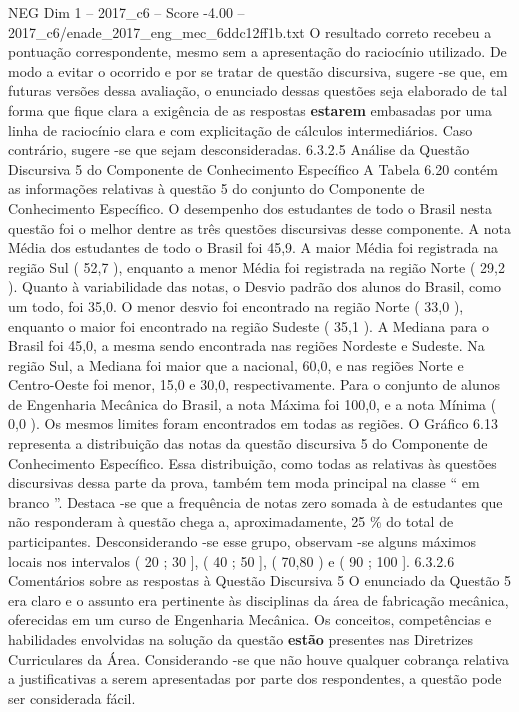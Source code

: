 \begin{textsample}{NEG Dim 1 – 2017\_c6 – Score -4.00 – 2017\_c6/enade\_2017\_eng\_mec\_6ddc12ff1b.txt}
O resultado correto recebeu a pontuação correspondente, mesmo sem a apresentação do raciocínio utilizado.
De modo a evitar o ocorrido e por se tratar de questão discursiva, sugere -se que, em futuras versões dessa avaliação, o enunciado dessas questões seja elaborado de tal forma que fique clara a exigência de as respostas \textbf{estarem} embasadas por uma linha de raciocínio clara e com explicitação de cálculos intermediários.
Caso contrário, sugere -se que sejam desconsideradas. 6.3.2.5 Análise da Questão Discursiva 5 do Componente de Conhecimento Específico A Tabela 6.20 contém as informações relativas à questão 5 do conjunto do Componente de Conhecimento Específico.
O desempenho dos estudantes de todo o Brasil nesta questão foi o melhor dentre as três questões discursivas desse componente.
A nota Média dos estudantes de todo o Brasil foi 45,9.
A maior Média foi registrada na região Sul ( 52,7 ), enquanto a menor Média foi registrada na região Norte ( 29,2 ).
Quanto à variabilidade das notas, o Desvio padrão dos alunos do Brasil, como um todo, foi 35,0.
O menor desvio foi encontrado na região Norte ( 33,0 ), enquanto o maior foi encontrado na região Sudeste ( 35,1 ).
A Mediana para o Brasil foi 45,0, a mesma sendo encontrada nas regiões Nordeste e Sudeste.
Na região Sul, a Mediana foi maior que a nacional, 60,0, e nas regiões Norte e Centro-Oeste foi menor, 15,0 e 30,0, respectivamente.
Para o conjunto de alunos de Engenharia Mecânica do Brasil, a nota Máxima foi 100,0, e a nota Mínima ( 0,0 ).
Os mesmos limites foram encontrados em todas as regiões.
O Gráfico 6.13 representa a distribuição das notas da questão discursiva 5 do Componente de Conhecimento Específico.
Essa distribuição, como todas as relativas às questões discursivas dessa parte da prova, também tem moda principal na classe “ em branco ”.
Destaca -se que a frequência de notas zero somada à de estudantes que não responderam à questão chega a, aproximadamente, 25 \% do total de participantes.
Desconsiderando -se esse grupo, observam -se alguns máximos locais nos intervalos ( 20 ; 30 ], ( 40 ; 50 ], ( 70,80 ) e ( 90 ; 100 ]. 6.3.2.6 Comentários sobre as respostas à Questão Discursiva 5 O enunciado da Questão 5 era claro e o assunto era pertinente às disciplinas da área de fabricação mecânica, oferecidas em um curso de Engenharia Mecânica.
Os conceitos, competências e habilidades envolvidas na solução da questão \textbf{estão} presentes nas Diretrizes Curriculares da Área.
Considerando -se que não houve qualquer cobrança relativa a justificativas a serem apresentadas por parte dos respondentes, a questão pode ser considerada fácil.

\end{textsample}
